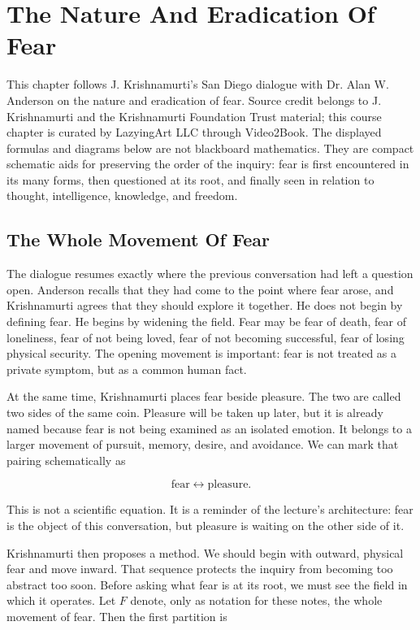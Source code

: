 \chapter{The Nature And Eradication Of Fear}

This chapter follows J. Krishnamurti's San Diego dialogue with Dr. Alan W. Anderson on the nature and eradication of fear. Source credit belongs to J. Krishnamurti and the Krishnamurti Foundation Trust material; this course chapter is curated by LazyingArt LLC through Video2Book. The displayed formulas and diagrams below are not blackboard mathematics. They are compact schematic aids for preserving the order of the inquiry: fear is first encountered in its many forms, then questioned at its root, and finally seen in relation to thought, intelligence, knowledge, and freedom.

\section{The Whole Movement Of Fear}

The dialogue resumes exactly where the previous conversation had left a question open. Anderson recalls that they had come to the point where fear arose, and Krishnamurti agrees that they should explore it together. He does not begin by defining fear. He begins by widening the field. Fear may be fear of death, fear of loneliness, fear of not being loved, fear of not becoming successful, fear of losing physical security. The opening movement is important: fear is not treated as a private symptom, but as a common human fact.

At the same time, Krishnamurti places fear beside pleasure. The two are called two sides of the same coin. Pleasure will be taken up later, but it is already named because fear is not being examined as an isolated emotion. It belongs to a larger movement of pursuit, memory, desire, and avoidance. We can mark that pairing schematically as

\begin{equation}
\text{fear} \leftrightarrow \text{pleasure}.
\end{equation}

This is not a scientific equation. It is a reminder of the lecture's architecture: fear is the object of this conversation, but pleasure is waiting on the other side of it.

Krishnamurti then proposes a method. We should begin with outward, physical fear and move inward. That sequence protects the inquiry from becoming too abstract too soon. Before asking what fear is at its root, we must see the field in which it operates. Let \(F\) denote, only as notation for these notes, the whole movement of fear. Then the first partition is


